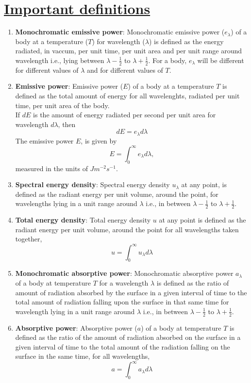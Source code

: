 \documentclass[16pt,a4paper]{article}
\begin{document}
\section{\underline{Important definitions }}
\begin{enumerate}
	\item \textbf{Monochromatic emissive power}: Monochromatic emissive power ($e_{\lambda}$) of a body at a temperature ($T$) for wavelength ($\lambda$) is defined as the energy radiated, in vaccum, per unit time, per unit area and per unit range around wavelength i.e., lying between $\lambda-\frac{1}{2}$ to $\lambda+\frac{1}{2}$. For a body, $e_{\lambda}$ will be different for different values of $\lambda$ and for different values of $T$.
	\item \textbf{Emissive power}: Emissive power ($E$) of a body at a temperature $T$ is defined as the total amount of energy for all wavelenghts, radiated per unit time, per unit area of the body.
	\\
	If $dE$ is the amount of energy radiated per second per unit area for wavelength $d\lambda$, then
	\begin{equation}
		dE = e_{\lambda}d\lambda
	\end{equation}
	The emissive power $E$, is given by
	\begin{equation}
		E = \int_{0}^{\infty} e_{\lambda}d\lambda,
	\end{equation}
	measured in the units of $Jm^{-2}s^{-1}$.
	
	\item \textbf{Spectral energy density}: Spectral energy density $u_{\lambda}$ at any point, is defined as the radiant energy per unit volume, around the point, for wavelengths lying in a unit range around $\lambda$ i.e., in between $\lambda-\frac{1}{2}$ to $\lambda+\frac{1}{2}$.
	\item \textbf{Total energy density}: Total energy density $u$ at any point is defined as the radiant energy per unit volume, around the point for all wavelengths taken together,
	\begin{equation}
		u = \int_{0}^{\infty} u_{\lambda}d\lambda
	\end{equation}
	
	\item \textbf{Monochromatic absorptive power}: Monochromatic absorptive power $a_{\lambda}$ of a body at temperature $T$ for a wavelength $\lambda$ is defined as the ratio of amount of radiation absorbed by the surface in a given interval of time to the total amount of radiation falling upon the surface in that same time for wavelength lying in a unit range around $\lambda$ i.e., in between $\lambda-\frac{1}{2}$ to $\lambda+\frac{1}{2}$.
	\item \textbf{Absorptive power}: Absorptive power ($a$) of a body at temperature $T$ is defined as the ratio of the amount of radiation absorbed on the surface in a given interval of time to the total amount of the radiation falling on the surface in the same time, for all wavelengths,
	\begin{equation}
		a = \int_{0}^{\infty}a_{\lambda}d\lambda
	\end{equation}
	
\end{enumerate}
	
\end{document}
